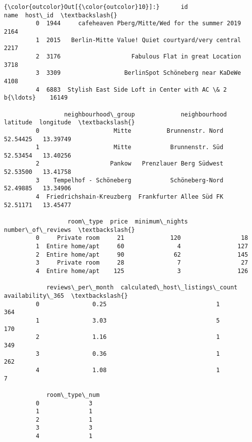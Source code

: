 \documentclass[11pt]{article}
\begin{document}
\begin{Verbatim}[commandchars=\\\{\}]
{\color{outcolor}Out[{\color{outcolor}10}]:}      id                                               name  host\_id  \textbackslash{}
         0  1944     cafeheaven Pberg/Mitte/Wed for the summer 2019     2164   
         1  2015   Berlin-Mitte Value! Quiet courtyard/very central     2217   
         2  3176                    Fabulous Flat in great Location     3718   
         3  3309                  BerlinSpot Schöneberg near KaDeWe     4108   
         4  6883  Stylish East Side Loft in Center with AC \& 2 b{\ldots}    16149   
         
                 neighbourhood\_group             neighbourhood  latitude  longitude  \textbackslash{}
         0                     Mitte          Brunnenstr. Nord  52.54425   13.39749   
         1                     Mitte           Brunnenstr. Süd  52.53454   13.40256   
         2                    Pankow   Prenzlauer Berg Südwest  52.53500   13.41758   
         3    Tempelhof - Schöneberg           Schöneberg-Nord  52.49885   13.34906   
         4  Friedrichshain-Kreuzberg  Frankfurter Allee Süd FK  52.51171   13.45477   
         
                  room\_type  price  minimum\_nights  number\_of\_reviews  \textbackslash{}
         0     Private room     21             120                 18   
         1  Entire home/apt     60               4                127   
         2  Entire home/apt     90              62                145   
         3     Private room     28               7                 27   
         4  Entire home/apt    125               3                126   
         
            reviews\_per\_month  calculated\_host\_listings\_count  availability\_365  \textbackslash{}
         0               0.25                               1               364   
         1               3.03                               5               170   
         2               1.16                               1               349   
         3               0.36                               1               262   
         4               1.08                               1                 7   
         
            room\_type\_num  
         0              3  
         1              1  
         2              1  
         3              3  
         4              1  
\end{Verbatim}
            
\end{document}

